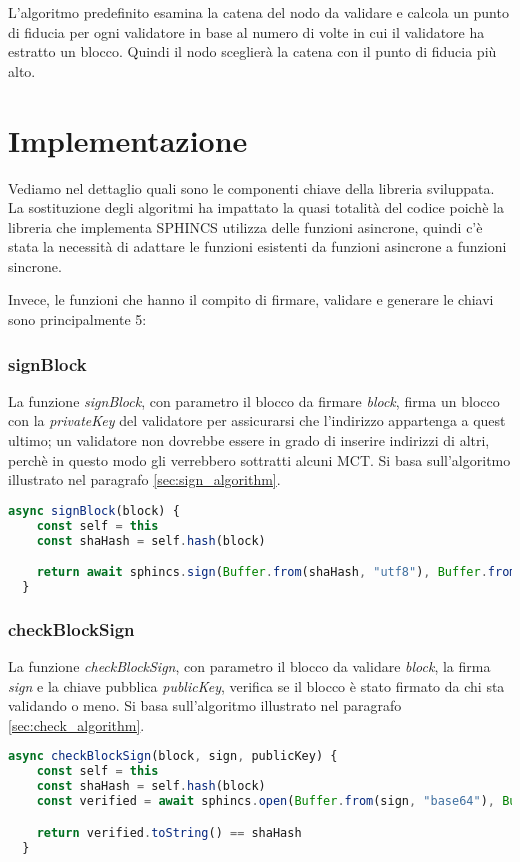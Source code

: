 L'algoritmo predefinito esamina la catena del nodo da validare e calcola un punto di fiducia per ogni validatore in base al numero di volte in cui il validatore ha estratto un blocco.
Quindi il nodo sceglierà la catena con il punto di fiducia più alto.

\section{Implementazione}
Vediamo nel dettaglio quali sono le componenti chiave della libreria sviluppata. La sostituzione degli algoritmi ha impattato la quasi totalità del codice poichè la libreria che implementa SPHINCS utilizza delle funzioni asincrone, quindi c'è stata la necessità di adattare le funzioni esistenti da funzioni asincrone a funzioni sincrone.

Invece, le funzioni che hanno il compito di firmare, validare e generare le chiavi sono principalmente 5:

\subsubsection{signBlock}
La funzione \textit{signBlock}, con parametro il blocco da firmare \textit{block}, firma un blocco con la \textit{privateKey} del validatore per assicurarsi che l'indirizzo appartenga a quest ultimo; un validatore non dovrebbe essere in grado di inserire indirizzi di altri, perchè in questo modo gli verrebbero sottratti alcuni MCT. Si basa sull'algoritmo illustrato nel paragrafo \ref{sec:sign_algorithm}.
\\
\begin{lstlisting}[language=JavaScript,breaklines]
  async signBlock(block) {
    const self = this
    const shaHash = self.hash(block)

    return await sphincs.sign(Buffer.from(shaHash, "utf8"), Buffer.from(self.validator.privateKey, 'hex'))
  }
\end{lstlisting}

\subsubsection{checkBlockSign}
La funzione \textit{checkBlockSign}, con parametro il blocco da validare \textit{block}, la firma \textit{sign} e la chiave pubblica \textit{publicKey}, verifica se il blocco è stato firmato da chi sta validando o meno. Si basa sull'algoritmo illustrato nel paragrafo \ref{sec:check_algorithm}.
\\
\begin{lstlisting}[language=JavaScript,breaklines]
  async checkBlockSign(block, sign, publicKey) {
    const self = this
    const shaHash = self.hash(block)
    const verified = await sphincs.open(Buffer.from(sign, "base64"), Buffer.from(publicKey, 'hex'));

    return verified.toString() == shaHash
  }
\end{lstlisting}

